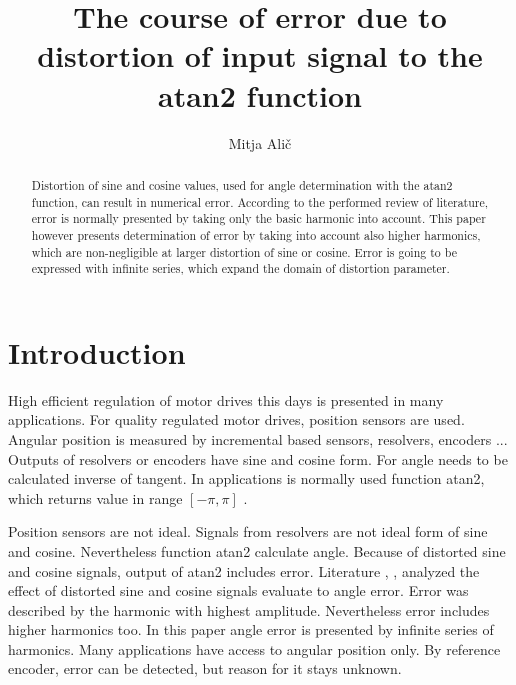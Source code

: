 \documentclass[a4paper]{article}
\begin{document}
\title{The course of error due to distortion of input signal to the atan2 function}

\author{Mitja Alič} %



\maketitle


\begin{abstract}{ }
Distortion of sine and cosine values, used for angle determination with the atan2 function, can result in numerical error. According to the performed review of literature, error is normally presented by taking only the basic harmonic into account. This paper however presents determination of error by taking into account also higher harmonics, which are non-negligible at larger distortion of sine or cosine. Error is going to be expressed with infinite series, which expand the domain of distortion parameter. 
\end{abstract}



\section{Introduction}

High efficient regulation of motor drives this days is presented in many applications. For quality regulated motor drives, position sensors are used\cite{uporaba_senzorjev}. Angular position is measured by incremental based sensors, resolvers, encoders \cite{inkrementalni}\cite{resolver}\cite{enkoder}... Outputs of resolvers or encoders have sine and cosine form. For angle  needs to be calculated inverse of tangent. In applications is normally used function atan2, which returns value in range $[-\pi, \pi]$ \cite{atan}.

Position sensors are not ideal. Signals from resolvers are not ideal form of sine and cosine. Nevertheless function atan2 calculate angle. Because of distorted sine and cosine signals, output of atan2 includes error. Literature \cite{RLS1}, \cite{RLS2}, \cite{RLS3}   analyzed the effect of distorted sine and cosine signals evaluate to angle error. Error was described by the harmonic with highest amplitude. Nevertheless error includes higher harmonics too. In this paper angle error is presented by infinite series of harmonics. Many applications have access to angular position only. By reference encoder, error can be detected, but reason for it stays unknown.
\end{document}
